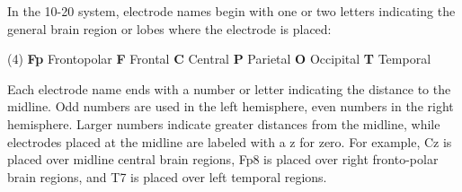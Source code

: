 In the 10-20 system, electrode names begin with one or two letters indicating the general brain region or lobes where the electrode is placed:

\bfseries \normalfont
\begin{tasks}[label-align=left, label-offset={0mm}, label-width={5mm}, item-indent={5mm}, label-format={\bfseries}, column-sep=10mm](4)
\task \textbf{Fp} Frontopolar
\task \textbf{F} Frontal
\task \textbf{C} Central
\task \textbf{P} Parietal
\task \textbf{O} Occipital
\task \textbf{T} Temporal
\end{tasks}

Each electrode name ends with a number or letter indicating the distance to the midline. Odd numbers are used in the left hemisphere, even numbers in the right hemisphere. Larger numbers indicate greater distances from the midline, while electrodes placed at the midline are labeled with a z for zero. For example, Cz is placed over midline central brain regions, Fp8 is placed over right fronto-polar brain regions, and T7 is placed over left temporal regions.